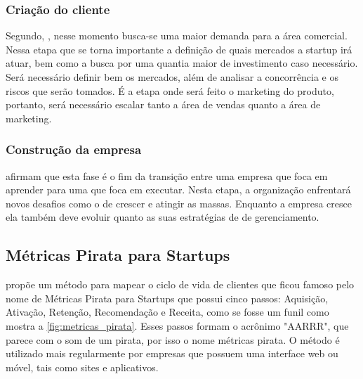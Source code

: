 \subsubsection{Criação do cliente}
\label{cha:criacao_do_cliente}
Segundo, , nesse momento busca-se uma maior demanda para a área comercial. Nessa etapa que se torna importante a definição de quais mercados a startup irá atuar, bem como a busca por uma quantia maior de investimento caso necessário. Será necessário definir bem os mercados, além de analisar a concorrência e os riscos que serão tomados. É a etapa onde será feito o marketing do produto, portanto, será necessário escalar tanto a área de vendas quanto a área de marketing.

\subsubsection{Construção da empresa}
\label{cha:construcao_da_empresa}
 afirmam que esta fase é o fim da transição entre uma empresa que foca em aprender para uma que foca em executar. Nesta etapa, a organização enfrentará novos desafios como o de crescer e atingir as massas. Enquanto a empresa cresce ela também deve evoluir quanto as suas estratégias de de gerenciamento.

\subsection{Métricas Pirata para Startups}
\label{cha:metricas_pirata}
 propõe um método para mapear o ciclo de vida de clientes que ficou famoso pelo nome de Métricas Pirata para Startups que possui cinco passos: Aquisição, Ativação, Retenção, Recomendação e Receita, como se fosse um funil como mostra a \autoref{fig:metricas_pirata}. Esses passos formam o acrônimo "AARRR", que parece com o som de um pirata, por isso o nome métricas pirata.
O método é utilizado mais regularmente por empresas que possuem uma interface web ou móvel, tais como sites e aplicativos.


